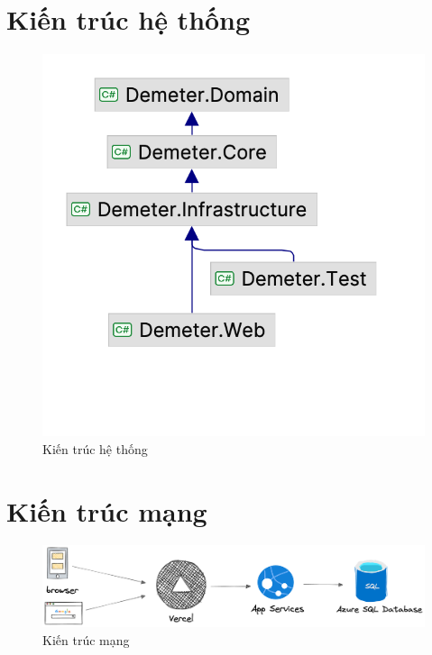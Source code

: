 \section{Kiến trúc hệ thống}
    \begin{figure}[h]
        \centering
        \includegraphics[width=0.6\linewidth]{Images/Demeter.png}
        \caption{Kiến trúc hệ thống}
    \end{figure}

\section{Kiến trúc mạng}
\begin{figure}[h]
        \centering
        \includegraphics[width=0.8\linewidth]{Images/network.png}
        \vspace{1em}
        \caption{Kiến trúc mạng}
        \label{fig:enter-label}
    \end{figure}

